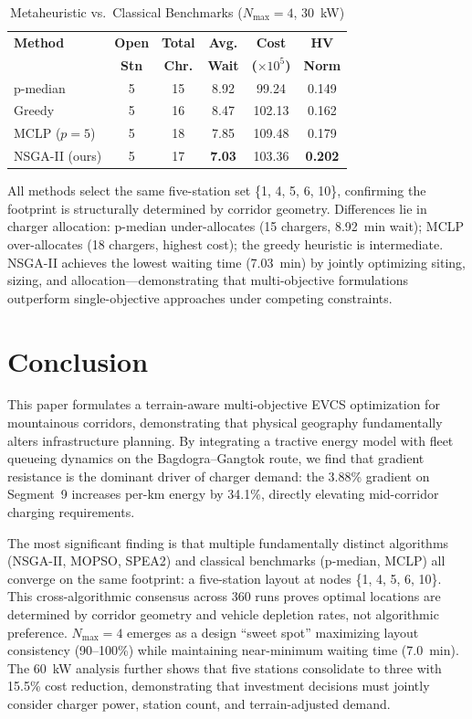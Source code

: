 \documentclass[conference]{IEEEtran}
\begin{document}
\begin{table}[htbp]
\caption{Metaheuristic vs.\ Classical Benchmarks ($N_{\max}=4$, 30~kW)}
\label{tab:baselines}
\centering
\small
\renewcommand{\arraystretch}{1.20}
\begin{tabular}{@{}lccccc@{}}
\toprule
\textbf{Method} & \textbf{Open} & \textbf{Total} & \textbf{Avg.} & \textbf{Cost} & \textbf{HV} \\
 & \textbf{Stn} & \textbf{Chr.} & \textbf{Wait} & \textbf{($\times 10^5$)} & \textbf{Norm} \\
\midrule
p-median & 5 & 15 & 8.92 & 99.24 & 0.149 \\
Greedy & 5 & 16 & 8.47 & 102.13 & 0.162 \\
MCLP ($p{=}5$) & 5 & 18 & 7.85 & 109.48 & 0.179 \\
\midrule
NSGA-II (ours) & 5 & 17 & \textbf{7.03} & 103.36 & \textbf{0.202} \\
\bottomrule
\end{tabular}
\end{table}

All methods select the same five-station set \{1, 4, 5, 6, 10\}, confirming the footprint is structurally determined by corridor geometry. Differences lie in charger allocation: p-median under-allocates (15 chargers, 8.92~min wait); MCLP over-allocates (18 chargers, highest cost); the greedy heuristic is intermediate. NSGA-II achieves the lowest waiting time (7.03~min) by jointly optimizing siting, sizing, and allocation---demonstrating that multi-objective formulations outperform single-objective approaches under competing constraints.

\section{Conclusion}
\label{sec:conclusion}

This paper formulates a terrain-aware multi-objective EVCS optimization for mountainous corridors, demonstrating that physical geography fundamentally alters infrastructure planning. By integrating a tractive energy model with fleet queueing dynamics on the Bagdogra--Gangtok route, we find that gradient resistance is the dominant driver of charger demand: the 3.88\% gradient on Segment~9 increases per-km energy by 34.1\%, directly elevating mid-corridor charging requirements.

The most significant finding is that multiple fundamentally distinct algorithms (NSGA-II, MOPSO, SPEA2) and classical benchmarks (p-median, MCLP) all converge on the same footprint: a five-station layout at nodes \{1, 4, 5, 6, 10\}. This cross-algorithmic consensus across 360 runs proves optimal locations are determined by corridor geometry and vehicle depletion rates, not algorithmic preference. $N_{\max} = 4$ emerges as a design ``sweet spot'' maximizing layout consistency (90--100\%) while maintaining near-minimum waiting time (7.0~min). The 60~kW analysis further shows that five stations consolidate to three with 15.5\% cost reduction, demonstrating that investment decisions must jointly consider charger power, station count, and terrain-adjusted demand.
\end{document}
